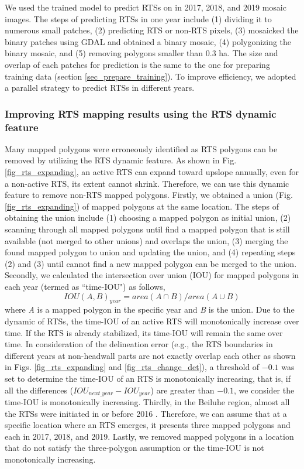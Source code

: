 \documentclass[authoryear,preprint,review,12pt]{elsarticle}
\begin{document}
We used the trained model to predict RTSs on in 2017, 2018, and 2019 mosaic images. 
The steps of predicting RTSs in one year include (1) dividing it to numerous small patches, 
(2) predicting RTS or non-RTS pixels, 
(3) mosaicked the binary patches using GDAL and obtained a binary mosaic, 
(4) polygonizing the binary mosaic, and 
(5) removing polygons smaller than 0.3 ha. 
The size and overlap of each patches for prediction is the same to the one for preparing training data (section \ref{sec_prepare_training}). 
To improve efficiency, we adopted a parallel strategy to predict RTSs in different years.


\subsubsection{Improving RTS mapping results using the RTS dynamic feature}
\label{sec_improving_using_rts_dynamic}

Many mapped polygons were erroneously identified as RTS polygons can be removed by utilizing the RTS dynamic feature. 
As shown in Fig. \ref{fig_rts_expanding}, an active RTS can expand toward upslope annually, even for a non-active RTS, its extent cannot shrink. 
Therefore, we can use this dynamic feature to remove non-RTS mapped polygons. 
Firstly, we obtained a union (Fig. \ref{fig_rts_expanding}) of mapped polygons at the same location.
The steps of obtaining the union include (1) choosing a mapped polygon as initial union, (2) scanning through all mapped polygons until find a mapped polygon that is still available (not merged to other unions) and overlaps the union, (3) merging the found mapped polygon to union and updating the union, and (4) repeating steps (2) and (3) until cannot find a new mapped polygon can be merged to the union. 
Secondly, we calculated the intersection over union (IOU) for mapped polygons in each year (termed as ``time-IOU") as follows, 
\begin{equation}
IOU(A,B)_{year}=area(A \cap B)/area(A \cup B)
\label{equ_time_iou}
\end{equation}
where \emph{A} is a mapped polygon in the specific year and \emph{B} is the union. 
Due to the dynamic of RTSs, the time-IOU of an active RTS will monotonically increase over time. 
If the RTS is already stabilized, its time-IOU will remain the same over time. 
In consideration of the delineation error (e.g., the RTS boundaries in different years at non-headwall parts are not exactly overlap each other as shown in Figs. \ref{fig_rts_expanding} and \ref{fig_rts_change_det}), a threshold of $-0.1$ was set to determine the time-IOU of an RTS is monotonically increasing, that is, if all the differences ($IOU_{next\_year}-IOU_{year}$) are greater than $-0.1$, we consider the time-IOU is monotonically increasing. 
Thirdly, in the Beiluhe region, almost all the RTSs were initiated in or before 2016 \citep{luo2019recent}.
Therefore, we can assume that at a specific location where an RTS emerges, it presents three mapped polygons and each in 2017, 2018, and 2019. 
Lastly, we removed mapped polygons in a location that do not satisfy the three-polygon assumption or the time-IOU is not monotonically increasing.
 
\end{document}
